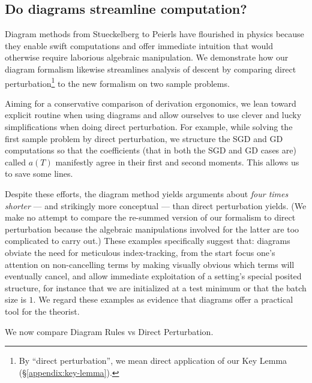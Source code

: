 \documentclass[anon,12pt]{colt2021} %
\begin{document}
    \subsection{Do diagrams streamline computation?}                \label{appendix:diagrams-streamline}

        Diagram methods from Stueckelberg to Peierls have flourished in physics
        because they enable swift computations and offer immediate intuition
        that would otherwise require laborious algebraic manipulation.  We
        demonstrate how our diagram formalism likewise streamlines analysis of
        descent by comparing direct perturbation\footnote{
            By ``direct perturbation'', we mean direct application of our Key
            Lemma (\S\ref{appendix:key-lemma}).
        }
        to the new formalism on two sample problems.

        Aiming for a conservative comparison of derivation ergonomics, we lean
        toward explicit routine when using diagrams and allow ourselves to use
        clever and lucky simplifications when doing direct perturbation.  For
        example, while solving the first sample problem by direct perturbation,
        we structure the SGD and GD computations so that the coefficients (that
        in both the SGD and GD cases are) called $a(T)$ manifestly agree in
        their first and second moments.  This allows us to save some lines.

        Despite these efforts, the diagram method yields arguments about
        \emph{four times shorter} --- and strikingly more conceptual --- than
        direct perturbation yields.  
        (We make no attempt to compare the re-summed version of our formalism to
        direct perturbation because the algebraic manipulations involved for
        the latter are too complicated to carry out.) 
        These examples specifically suggest that:
        diagrams obviate the need for meticulous index-tracking, from the start
        focus one's attention on non-cancelling terms by making visually
        obvious which terms will eventually cancel, and allow immediate
        exploitation of a setting's special posited structure, for instance
        that we are initialized at a test minimum or that the batch size is
        $1$.  We regard these examples as evidence that diagrams offer a
        practical tool for the theorist.

        We now compare {\colorbox{moolime}{Diagram Rules}} vs
        {\colorbox{moosky}{Direct Perturbation}}.
\end{document}

